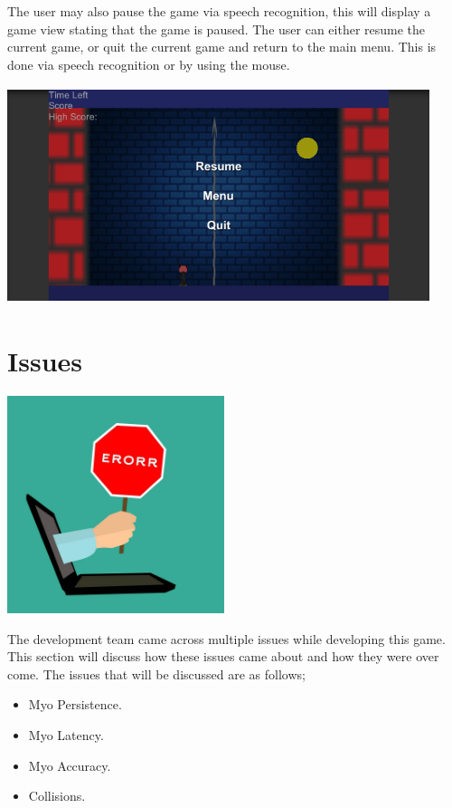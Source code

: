 \documentclass{article}
\begin{document}
The user may also pause the game via speech recognition, this will display a game view stating that the game is paused. The user can either resume the current game, or quit the current game and return to the main menu. This is done via speech recognition or by using the mouse.

\bigskip
\includegraphics[width=350pt, height=180pt]{img/pausemenu.PNG}
\bigskip

\clearpage
\section{Issues}
\includegraphics[width=\textwidth, height=180pt]{img/Error.jpg}

\bigskip
The development team came across multiple issues while developing this game. This section will discuss how these issues came about and how they were over come. The issues that will be discussed are as follows;

\begin{itemize}
    \item Myo Persistence.
    \item Myo Latency.
    \item Myo Accuracy. 
    \item Collisions.
\end{itemize}
\end{document}
